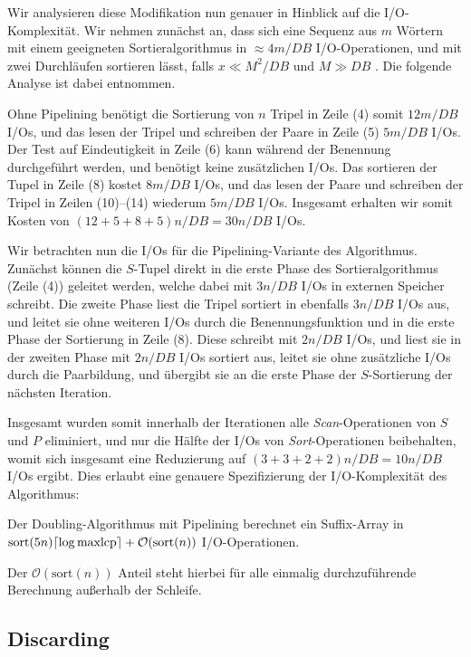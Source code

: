 Wir analysieren diese Modifikation nun genauer in Hinblick auf die I/O-Komplexität. Wir nehmen zunächst an, dass sich eine Sequenz aus $m$ Wörtern mit einem geeigneten Sortieralgorithmus in $\approx 4m/DB$ I/O-Operationen, und mit zwei Durchläufen sortieren lässt, falls $x \ll M^2/DB$ und $M \gg DB$ \cite{Aggarwal1988}. Die folgende Analyse ist dabei \cite{saca:11} entnommen.

Ohne Pipelining benötigt die Sortierung von $n$ Tripel in Zeile (4) somit $12m/DB$ I/Os, und das lesen der Tripel und schreiben der Paare in Zeile (5) $5m/DB$ I/Os. Der Test auf Eindeutigkeit in Zeile (6) kann während der Benennung durchgeführt werden, und benötigt keine zusätzlichen I/Os. Das sortieren der Tupel in Zeile (8) kostet $8m/DB$ I/Os, und das lesen der Paare und schreiben der Tripel in Zeilen (10)--(14) wiederum  $5m/DB$ I/Os. Insgesamt erhalten wir somit Kosten von $(12 + 5 + 8 +5)n/DB = 30n/DB$ I/Os.

Wir betrachten nun die I/Os für die Pipelining-Variante des Algorithmus. Zunächst können die $S$-Tupel direkt in die erste Phase des Sortieralgorithmus (Zeile (4)) geleitet werden, welche dabei mit $3n/DB$ I/Os in externen Speicher schreibt. Die zweite Phase liest die Tripel sortiert in ebenfalls $3n/DB$ I/Os aus, und leitet sie ohne weiteren I/Os durch die Benennungsfunktion und in die erste Phase der Sortierung in Zeile (8). Diese schreibt mit $2n/DB$ I/Os, und liest sie in der zweiten Phase mit $2n/DB$ I/Os sortiert aus, leitet sie ohne zusätzliche I/Os durch die Paarbildung, und übergibt sie an die erste Phase der $S$-Sortierung der nächsten Iteration. 

Insgesamt wurden somit innerhalb der Iterationen alle \textit{Scan}-Operationen von $S$ und $P$ eliminiert, und nur die Hälfte der I/Os von \textit{Sort}-Operationen beibehalten, womit sich insgesamt eine Reduzierung auf $(3 + 3 + 2 + 2)n/DB = 10n/DB$ I/Os ergibt. Dies erlaubt eine genauere Spezifizierung der I/O-Komplexität des Algorithmus:

\begin{theorem}
Der Doubling-Algorithmus mit Pipelining berechnet ein Suffix-Array in $\text{sort}(5n) \ceil*{\log \text{maxlcp}} +  \mathcal{O}(\text{sort}(n))$ I/O-Operationen.
\end{theorem}

Der $\mathcal{O}(\text{sort}(n))$ Anteil steht hierbei für alle einmalig durchzuführende Berechnung außerhalb der Schleife.

\subsection{Discarding}
\label{algo:doubling:sec:discarding}

